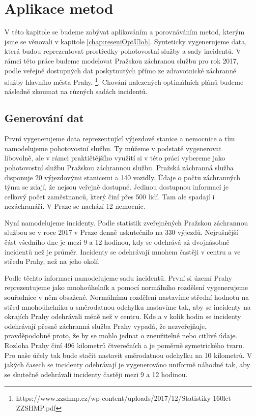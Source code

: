 \chapter{Aplikace metod}

V této kapitole se budeme zabývat aplikováním a porovnáváním metod, kterým jsme se věnovali v kapitole \ref{chap:reseniOptUloh}.
Synteticky vygenerujeme data, která budou reprezentovat prostředky pohotovostní služby a sady incidentů. 
V rámci této práce budeme modelovat Pražskou záchranou službu pro rok 2017, podle veřejně dostupných dat
poskytnutých přímo ze zdravotnické záchranné služby hlavního města Prahy.
\footnote{https://www.zzshmp.cz/wp-content/uploads/2017/12/Statistiky-160let-ZZSHMP.pdf}.
Chování nalezených optimálních plánů budeme následně zkoumat na různých sadách incidentů.

\section{Generování dat}

První vygenerujeme data reprezentující výjezdové stanice a nemocnice a tím namodelujeme pohotovostní službu.
Ty můžeme v podstatě vygenerovat libovolně, ale v rámci praktičtějšího využití
si v této práci vybereme jako pohotovostní službu Pražskou záchrannou službu.
Pražská záchranná služba disponuje 20 výjezdovými stanicemi a 140 vozidly.
Údaje o počtu záchranných týmu se zdají, že nejsou veřejně dostupné. Jedinou dostupnou informací je celkový počet zaměstnanců, který činí přes 500 lidí.
Tam ale spadají i nezáchranáři.
V Praze se nachází 12 nemocnic.

Nyní namodelujeme incidenty. Podle statistik zveřejněných Pražskou záchrannou službou se v roce 2017 v Praze denně uskutečnilo na 330 výjezdů.
Nejrušnější část všedního dne je mezi 9 a 12 hodinou, kdy se odehrává až dvojnásobně incidentů než je průměr.
Incidenty se odehrávají mnohem častěji v centru a ve středu Prahy, než na jeho okolí. 

Podle těchto informací namodelujeme sadu incidentů.
První si území Prahy reprezentujeme jako mnohoúhelník a pomocí normálního rozdělení vygenerujeme souřadnice v něm obsažené.
Normálnímu rozdělení nastavíme střední hodnotu na střed mnohoúhelníku a směrodatnou odchylku nastavíme tak, aby se incidenty na okrajích Prahy odehrávali méně než v centru. 
Kde a v kolik hodin se incidenty odehrávají přesně záchranná služba Prahy vypadá, že nezveřejňuje, pravděpodobně proto, že by se mohlo jednat o zneužitelné nebo citlivé údaje.
Rozloha Prahy činí 496 kilometrů čtverečních a je poměrně symetrického tvaru. Pro naše účely tak bude stačit nastavit směrodatnou odchylku na 10 kilometrů.
V jakých časech se incidenty odehrávají je vygenerováno uniformě náhodně tak, aby se skutečně odehrávali incidenty častěji mezi 9 a 12 hodinou.

